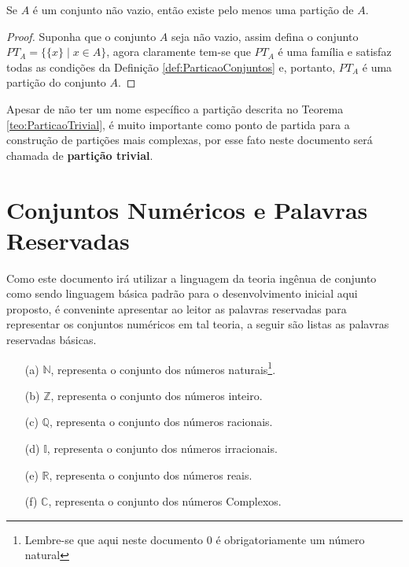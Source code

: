 \begin{teorema}\label{teo:ParticaoTrivial}
	Se $A$ é um conjunto não vazio, então existe pelo menos uma partição de $A$.
\end{teorema}

\begin{proof}
	Suponha que o conjunto $A$ seja não vazio, assim defina o conjunto $PT_A = \{\{x\} \mid x \in A\}$, agora claramente tem-se que $PT_A$ é uma família e satisfaz todas as condições da Definição \ref{def:ParticaoConjuntos} e, portanto, $PT_A$ é uma partição do conjunto $A$.
\end{proof}

\begin{nota}
  Apesar de não ter um nome específico a partição descrita no Teorema \ref{teo:ParticaoTrivial}, é muito importante como ponto de partida para a construção de partições mais complexas, por esse fato neste documento será chamada de \textbf{partição trivial}.
\end{nota}

\section{Conjuntos Numéricos e Palavras Reservadas}\label{sec:ConjuntoNumericoPalavrasReservadas}

Como este documento irá  utilizar a linguagem da teoria ingênua de conjunto como sendo linguagem básica padrão para o desenvolvimento inicial aqui proposto, é conveninte apresentar ao leitor as palavras reservadas para representar os conjuntos numéricos em tal teoria, a seguir são listas as palavras reservadas básicas.

\begin{itemize}
  \item[(a)] $\mathbb{N}$, representa o conjunto dos números naturais\footnote{Lembre-se que aqui neste documento $0$ é obrigatoriamente um número natural}.
  \item[(b)] $\mathbb{Z}$, representa o conjunto dos números inteiro.
  \item[(c)] $\mathbb{Q}$, representa o conjunto dos números racionais.
  \item[(d)] $\mathbb{I}$, representa o conjunto dos números irracionais.
  \item[(e)] $\mathbb{R}$, representa o conjunto dos números reais.
  \item[(f)] $\mathbb{C}$, representa o conjunto dos números Complexos.
\end{itemize}

